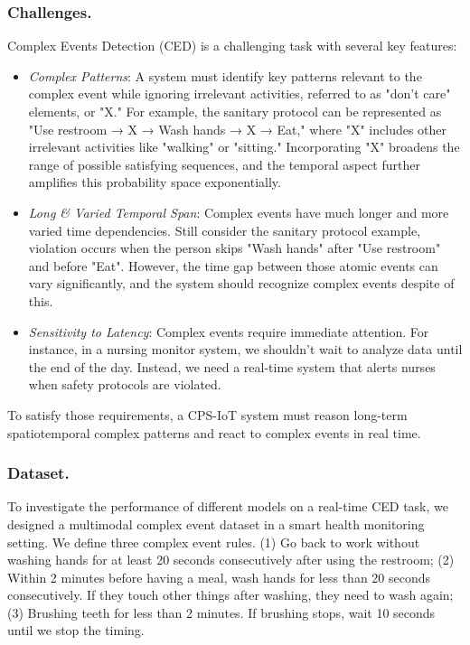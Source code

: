 \subsubsection{Challenges.}
Complex Events Detection (CED) is a challenging task with several key features:
\begin{itemize}%
    \item \textit{Complex Patterns}: A system must identify key patterns relevant to the complex event while ignoring irrelevant activities, referred to as "don’t care" elements, or "X." For example, the sanitary protocol can be represented as "Use restroom → X → Wash hands → X → Eat," where "X" includes other irrelevant activities like "walking" or "sitting." Incorporating "X" broadens the range of possible satisfying sequences, and the temporal aspect further amplifies this probability space exponentially.%

    \item \textit{Long \& Varied Temporal Span}: Complex events have much longer and more varied time dependencies. Still consider the sanitary protocol example, violation occurs when the person skips "Wash hands" after "Use restroom" and before "Eat". However, the time gap between those atomic events can vary significantly, and the system should recognize complex events despite of this.
    
    \item \textit{Sensitivity to Latency}: Complex events require immediate attention. For instance, in a nursing monitor system, we shouldn't wait to analyze data until the end of the day. Instead, we need a real-time system that alerts nurses when safety protocols are violated.
\end{itemize}
To satisfy those requirements, a CPS-IoT system must reason long-term spatiotemporal complex patterns and react to complex events in real time.

\subsubsection{Dataset.}
To investigate the performance of different models on a real-time CED task, we designed a multimodal complex event dataset in a smart health monitoring setting. We define three complex event rules\label{ce_definitions}. (1) Go back to work without washing hands for at least 20 seconds consecutively after using the restroom; (2) Within 2 minutes before having a meal, wash hands for less than 20 seconds consecutively. If they touch other things after washing, they need to wash again; (3) Brushing teeth for less than 2 minutes. If brushing stops, wait 10 seconds until we stop the timing.

